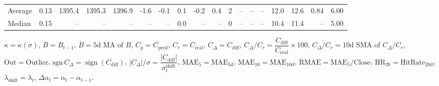 \begin{threeparttable}
{\begin{tabular}{lrrrrrrrrrrrrrrrrr}
Average &     0.13 & 1395.4 & 1395.3 & 1396.9 &       -1.6 &           -0.1 &                       0.1 &                     -0.2 &                 0.4 &              2 &         -- &        -- &             -- &             12.0 &                12.6 &            0.84 &                   6.00 \\
 Median &     0.15 &     -- &     -- &     -- &         -- &             -- &                       0.0 &                       -- &                  -- &              0 &         -- &        -- &             -- &             10.4 &                11.4 &              -- &                   5.00 \\
\bottomrule
\end{tabular}
}
\begin{tablenotes}\footnotesize
\item $\kappa=\kappa(\sigma)$, $B=B_{t-1}$, $\overline{B}=\text{5d MA of }B$, $C_p=C_{\text{pred}}$, $C_r=C_{\text{real}}$, $C_\Delta=C_{\text{diff}}$, $C_\Delta/C_r=\dfrac{C_{\text{diff}}}{C_{\text{real}}}\times100$, $\overline{C_\Delta/C_r}=\text{10d SMA of }C_\Delta/C_r$, $\mathrm{Out}=\text{Outlier}$, $\mathrm{sgn}\,C_\Delta=\operatorname{sign}(C_{\text{diff}})$, $|C_\Delta|/\sigma=\dfrac{|C_{\text{diff}}|}{\sigma_t^{\text{shift}}}$, $\mathrm{MAE}_5=\mathrm{MAE}_{5\text{d}}$, $\mathrm{MAE}_{10}=\mathrm{MAE}_{10\text{d}}$, $\mathrm{RMAE}= \mathrm{MAE}_5 / \text{Close}$, $\mathrm{HR}_{20}=\mathrm{HitRate}_{20\text{d}}$, $\lambda_{\text{shift}}=\lambda_t$, $\Delta\alpha_t=\alpha_t-\alpha_{t-1}$.
\end{tablenotes}
\end{threeparttable}
\endgroup

